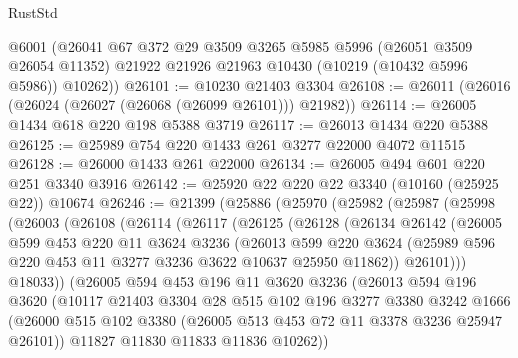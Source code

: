 \begin{lexlean}{RustStd}
\begin{coremodule}
      @6001
      (@26041
        @67
        @372
        @29
        @3509
        @3265
        @5985
        @5996
        (@26051 @3509 @26054 @11352)
        @21922
        @21926
        @21963
        @10430
        (@10219 (@10432 @5996 @5986))
        @10262))
@26101 := @10230 @21403 @3304
@26108 := @26011 (@26016 (@26024 (@26027 (@26068 (@26099 @26101))) @21982))
@26114 := @26005 @1434 @618 @220 @198 @5388 @3719
@26117 := @26013 @1434 @220 @5388
@26125 := @25989 @754 @220 @1433 @261 @3277 @22000 @4072 @11515
@26128 := @26000 @1433 @261 @22000
@26134 := @26005 @494 @601 @220 @251 @3340 @3916
@26142 := @25920 @22 @220 @22 @3340 (@10160 (@25925 @22)) @10674
@26246 := @21399
    (@25886
      (@25970
        (@25982
          (@25987
            (@25998
              (@26003
                (@26108
                  (@26114
                    (@26117
                      (@26125
                        (@26128
                          (@26134
                            @26142
                            (@26005
                              @599
                              @453
                              @220
                              @11
                              @3624
                              @3236
                              (@26013
                                @599
                                @220
                                @3624
                                (@25989 @596 @220 @453 @11 @3277 @3236 @3622 @10637 @25950 @11862))
                              @26101)))
                        @18033))
                    (@26005
                      @594
                      @453
                      @196
                      @11
                      @3620
                      @3236
                      (@26013
                        @594
                        @196
                        @3620
                        (@10117
                          @21403
                          @3304
                          @28
                          @515
                          @102
                          @196
                          @3277
                          @3380
                          @3242
                          @1666
                          (@26000
                            @515
                            @102
                            @3380
                            (@26005 @513 @453 @72 @11 @3378 @3236 @25947 @26101))
                          @11827
                          @11830
                          @11833
                          @11836
                          @10262))

\end{coremodule}
\end{lexlean}
